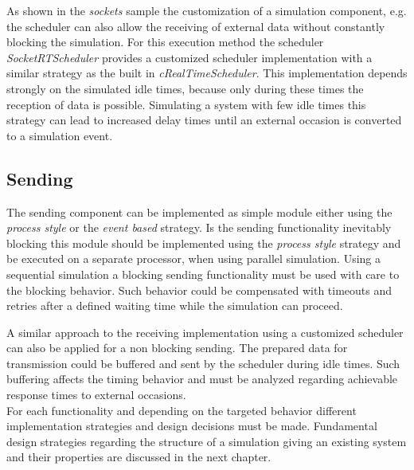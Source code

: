 As shown in the \emph{sockets} sample the customization of a simulation component, e.g. the scheduler can also allow the receiving of external data without constantly blocking the simulation.
For this execution method the scheduler \emph{SocketRTScheduler} provides a customized scheduler implementation with a similar strategy as the built in \emph{cRealTimeScheduler}.
This implementation depends strongly on the simulated idle times, because only during these times the reception of data is possible.
Simulating a system with few idle times this strategy can lead to increased delay times until an external occasion is converted to a simulation event.

\subsection{Sending}
\label{sec:emulation_communication_sending}
The sending component can be implemented as simple module either using the \emph{process style} or the \emph{event based} strategy.
Is the sending functionality inevitably blocking this module should be implemented using the \emph{process style} strategy and be executed on a separate processor, when using parallel simulation.
Using a sequential simulation a blocking sending functionality must be used with care to the blocking behavior.
Such behavior could be compensated with timeouts and retries after a defined waiting time while the simulation can proceed.

A similar approach to the receiving implementation using a customized scheduler can also be applied for a non blocking sending.
The prepared data for transmission could be buffered and sent by the scheduler during idle times.
Such buffering affects the timing behavior and must be analyzed regarding achievable response times to external occasions.
\\

For each functionality and depending on the targeted behavior different implementation strategies and design decisions must be made.
Fundamental design strategies regarding the structure of a simulation giving an existing system and their properties are discussed in the next chapter.